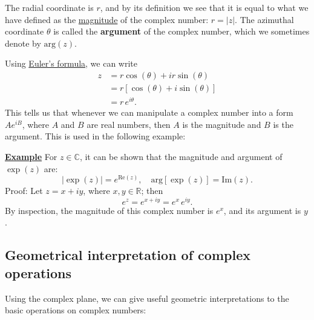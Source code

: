 \documentclass[10pt,a4paper]{article}
\begin{document}
\noindent
The radial coordinate is $r$, and by its definition we see that it is
equal to what we have defined as the
\hyperref[magnitudes-and-conjugates]{magnitude} of the complex number:
$r = |z|$. The azimuthal coordinate $\theta$ is called the
\textbf{argument} of the complex number, which we sometimes denote by
$\mathrm{arg}(z)$.

Using \hyperref[eulers-formula]{Euler's formula}, we can write
\begin{align}
  z &= r\cos(\theta) + i r\sin(\theta)\\
  &= r \left[\cos(\theta) + i \sin(\theta)\right] \\
  &= r \, e^{i\theta}.
\end{align}
This tells us that whenever we can manipulate a complex number into a
form $A e^{iB}$, where $A$ and $B$ are real numbers, then $A$ is
the magnitude and $B$ is the argument. This is used in the following
example:

\begin{framed}
\noindent
\underline{\textbf{Example}}
\vskip 0.1in \noindent
For $z \in \mathbb{C}$, it can be shown that the magnitude and argument
of $\exp(z)$ are:
\begin{equation}
  \left|\exp(z)\right| = e^{\mathrm{Re}(z)}, \quad
  \mathrm{arg}\left[\exp(z)\right] = \mathrm{Im}(z).
\end{equation}
Proof: Let $z = x + i y$, where $x, y \in \mathbb{R}$; then
\begin{equation}
  e^{z} = e^{x + i y} = e^x \, e^{iy}.
\end{equation}
By inspection, the magnitude of this complex number is $e^x$, and its
argument is $y$.
\end{framed}

\subsection{Geometrical interpretation of complex operations}
\label{geometrical-interpretation-of-complex-operations}

Using the complex plane, we can give useful geometric interpretations to
the basic operations on complex numbers:
\end{document}
